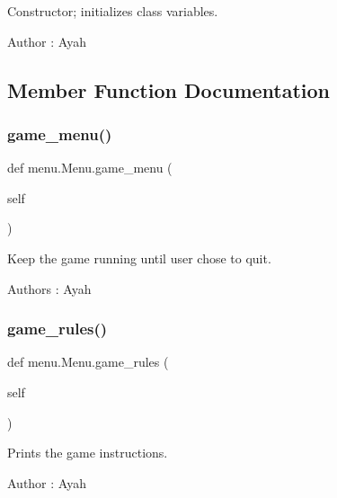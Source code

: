 Constructor; initializes class variables. 

\begin{DoxyAuthor}{Author}
\+: Ayah 
\end{DoxyAuthor}


\subsection{Member Function Documentation}
\mbox{\label{classmenu_1_1_menu_a381788e2ab89d492b6358fc843d41ea1}} 
\subsubsection{\texorpdfstring{game\+\_\+menu()}{game\_menu()}}
{\footnotesize\ttfamily def menu.\+Menu.\+game\+\_\+menu (\begin{DoxyParamCaption}\item[{}]{self }\end{DoxyParamCaption})}



Keep the game running until user chose to quit. 

\begin{DoxyAuthor}{Authors}
\+: Ayah 
\end{DoxyAuthor}
\mbox{\label{classmenu_1_1_menu_acd23946f3b85acfc3541b62afd230f17}} 
\subsubsection{\texorpdfstring{game\+\_\+rules()}{game\_rules()}}
{\footnotesize\ttfamily def menu.\+Menu.\+game\+\_\+rules (\begin{DoxyParamCaption}\item[{}]{self }\end{DoxyParamCaption})}



Prints the game instructions. 

\begin{DoxyAuthor}{Author}
\+: Ayah 
\end{DoxyAuthor}
\mbox{\label{classmenu_1_1_menu_a0215d21cb724dc2843e923476089a5fe}} 

